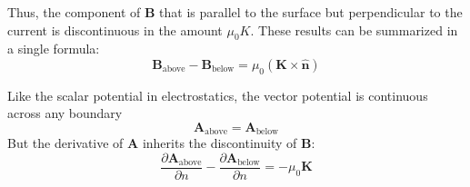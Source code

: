 \documentclass[../../../main.tex]{subfiles}
\begin{document}
Thus, the component of $\mathbf{B}$ that is parallel to the surface but perpendicular to the current is discontinuous in the amount $\mu_0K$. These results can be summarized in a single formula:
\begin{equation*}
    \mathbf{B}_\text{above}-\mathbf{B}_\text{below}=\mu_0(\mathbf{K}\times\mathbf{\hat{n}})
\end{equation*}

Like the scalar potential in electrostatics, the vector potential is continuous
across any boundary
\begin{equation*}
    \mathbf{A}_\text{above}=\mathbf{A}_\text{below}
\end{equation*}
But the derivative of \textbf{A} inherits the discontinuity of \textbf{B}:
\begin{equation*}
    \frac{\partial \mathbf{A}_\text{above}}{ \partial n}-\frac{\partial \mathbf{A}_\text{below}}{\partial n}= -\mu_0\mathbf{K}
\end{equation*}
\end{document}
